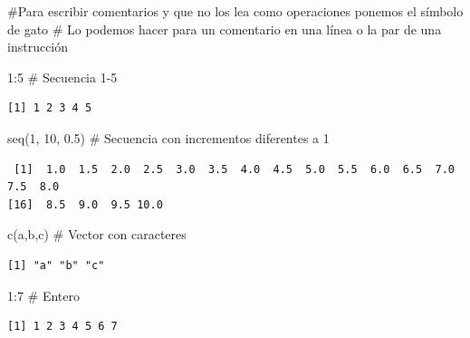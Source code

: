 \documentclass[
  letterpaper,
  DIV=11,
  numbers=noendperiod]{scrreprt}
\newenvironment{Shaded}{\begin{snugshade}}{\end{snugshade}}
\newcommand{\CommentTok}[1]{\textcolor[rgb]{0.37,0.37,0.37}{#1}}
\newcommand{\DecValTok}[1]{\textcolor[rgb]{0.68,0.00,0.00}{#1}}
\newcommand{\FloatTok}[1]{\textcolor[rgb]{0.68,0.00,0.00}{#1}}
\newcommand{\FunctionTok}[1]{\textcolor[rgb]{0.28,0.35,0.67}{#1}}
\newcommand{\NormalTok}[1]{\textcolor[rgb]{0.00,0.23,0.31}{#1}}
\newcommand{\SpecialCharTok}[1]{\textcolor[rgb]{0.37,0.37,0.37}{#1}}
\newcommand{\StringTok}[1]{\textcolor[rgb]{0.13,0.47,0.30}{#1}}
\begin{document}
\begin{Shaded}
\begin{Highlighting}[]
\CommentTok{\#Para escribir comentarios y que no los lea como operaciones ponemos el símbolo de gato}
\CommentTok{\# Lo podemos hacer para un comentario en una línea o la par de una instrucción}

\DecValTok{1}\SpecialCharTok{:}\DecValTok{5}               \CommentTok{\# Secuencia 1{-}5}
\end{Highlighting}
\end{Shaded}

\begin{verbatim}
[1] 1 2 3 4 5
\end{verbatim}

\begin{Shaded}
\begin{Highlighting}[]
\FunctionTok{seq}\NormalTok{(}\DecValTok{1}\NormalTok{, }\DecValTok{10}\NormalTok{, }\FloatTok{0.5}\NormalTok{)   }\CommentTok{\# Secuencia con incrementos diferentes a 1}
\end{Highlighting}
\end{Shaded}

\begin{verbatim}
 [1]  1.0  1.5  2.0  2.5  3.0  3.5  4.0  4.5  5.0  5.5  6.0  6.5  7.0  7.5  8.0
[16]  8.5  9.0  9.5 10.0
\end{verbatim}

\begin{Shaded}
\begin{Highlighting}[]
\FunctionTok{c}\NormalTok{(}\StringTok{\textquotesingle{}a\textquotesingle{}}\NormalTok{,}\StringTok{\textquotesingle{}b\textquotesingle{}}\NormalTok{,}\StringTok{\textquotesingle{}c\textquotesingle{}}\NormalTok{)  }\CommentTok{\# Vector con caracteres}
\end{Highlighting}
\end{Shaded}

\begin{verbatim}
[1] "a" "b" "c"
\end{verbatim}

\begin{Shaded}
\begin{Highlighting}[]
\DecValTok{1}\SpecialCharTok{:}\DecValTok{7}             \CommentTok{\# Entero}
\end{Highlighting}
\end{Shaded}

\begin{verbatim}
[1] 1 2 3 4 5 6 7
\end{verbatim}
\end{document}
